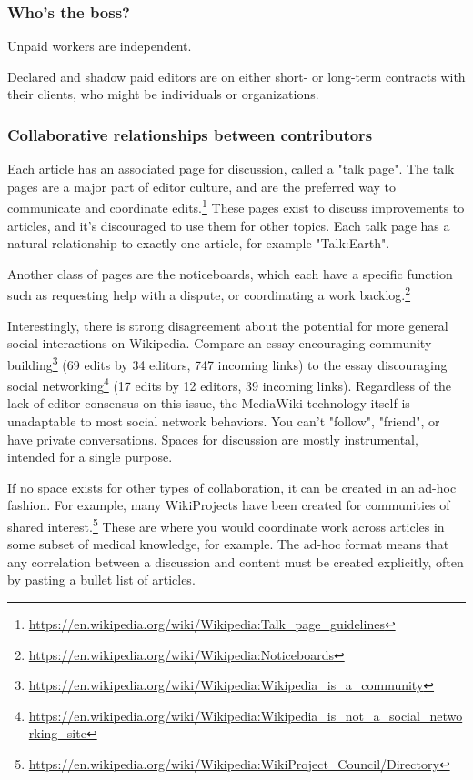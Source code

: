 \documentclass[format=sigconf, authorversion]{acmart}
\begin{document}
\subsubsection{Who's the boss?}

Unpaid workers are independent.

Declared and shadow paid editors are on either short- or long-term contracts with their clients, who might be individuals or organizations.  

\subsubsection{Collaborative relationships between contributors}

Each article has an associated page for discussion, called a "talk page".  The talk pages are a major part of editor culture, and are the preferred way to communicate and coordinate edits.\footnote{\url{https://en.wikipedia.org/wiki/Wikipedia:Talk_page_guidelines}}  These pages exist to discuss improvements to articles, and it's discouraged to use them for other topics.  Each talk page has a natural relationship to exactly one article, for example "Talk:Earth".

Another class of pages are the noticeboards, which each have a specific function such as requesting help with a dispute, or coordinating a work backlog.\footnote{\url{https://en.wikipedia.org/wiki/Wikipedia:Noticeboards}}

Interestingly, there is strong disagreement about the potential for more general social interactions on Wikipedia.  Compare an essay encouraging community-building\footnote{\url{https://en.wikipedia.org/wiki/Wikipedia:Wikipedia_is_a_community}} (69 edits by 34 editors, 747 incoming links) to the essay discouraging social networking\footnote{\url{https://en.wikipedia.org/wiki/Wikipedia:Wikipedia_is_not_a_social_networking_site}} (17 edits by 12 editors, 39 incoming links).  Regardless of the lack of editor consensus on this issue, the MediaWiki technology itself is unadaptable to most social network behaviors.  You can't "follow", "friend", or have private conversations.  Spaces for discussion are mostly instrumental, intended for a single purpose.

If no space exists for other types of collaboration, it can be created in an ad-hoc fashion.  For example, many WikiProjects have been created for communities of shared interest.\footnote{\url{https://en.wikipedia.org/wiki/Wikipedia:WikiProject_Council/Directory}}  These are where you would coordinate work across articles in some subset of medical knowledge, for example.  The ad-hoc format means that any correlation between a discussion and content must be created explicitly, often by pasting a bullet list of articles.
\end{document}
